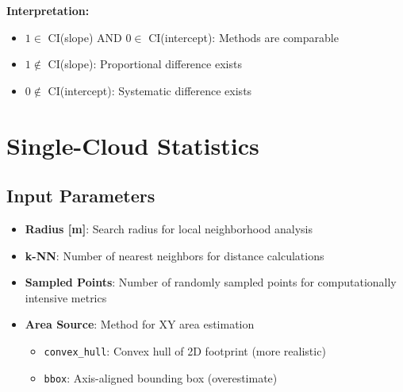 \documentclass[12pt]{article}
\begin{document}
\textbf{Interpretation:}
\begin{itemize}
    \item $1 \in$ CI(slope) AND $0 \in$ CI(intercept): Methods are comparable
    \item $1 \notin$ CI(slope): Proportional difference exists
    \item $0 \notin$ CI(intercept): Systematic difference exists
\end{itemize}

\section{Single-Cloud Statistics}

\subsection{Input Parameters}
\begin{itemize}
    \item \textbf{Radius [m]}: Search radius for local neighborhood analysis
    \item \textbf{k-NN}: Number of nearest neighbors for distance calculations
    \item \textbf{Sampled Points}: Number of randomly sampled points for computationally intensive metrics
    \item \textbf{Area Source}: Method for XY area estimation
    \begin{itemize}
        \item \texttt{convex\_hull}: Convex hull of 2D footprint (more realistic)
        \item \texttt{bbox}: Axis-aligned bounding box (overestimate)
    \end{itemize}
\end{itemize}
\end{document}
